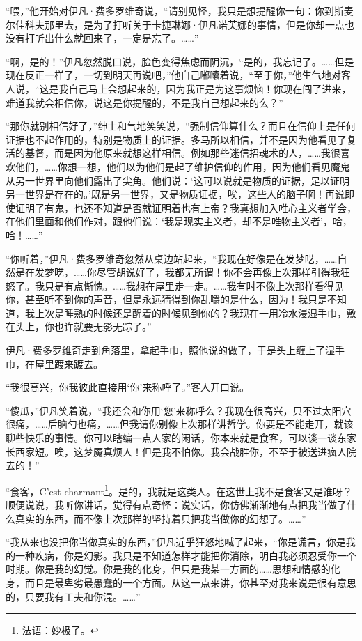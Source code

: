 \par “喂，”他开始对伊凡·费多罗维奇说，“请别见怪，我只是想提醒你一句：你到斯麦尔佳科夫那里去，是为了打听关于卡捷琳娜·伊凡诺芙娜的事情，但是你却一点也没有打听出什么就回来了，一定是忘了。……”
\par “啊，是的！”伊凡忽然脱口说，脸色变得焦虑而阴沉，“是的，我忘记了。……但是现在反正一样了，一切到明天再说吧，”他自己嘟囔着说，“至于你，”他生气地对客人说，“这是我自己马上会想起来的，因为我正是为这事烦恼！你现在闯了进来，难道我就会相信你，说这是你提醒的，不是我自己想起来的么？”
\par “那你就别相信好了，”绅士和气地笑笑说，“强制信仰算什么？而且在信仰上是任何证据也不起作用的，特别是物质上的证据。多马所以相信，并不是因为他看见了复活的基督，而是因为他原来就想这样相信。例如那些迷信招魂术的人，……我很喜欢他们，……你想一想，他们以为他们是起了维护信仰的作用，因为他们看见魔鬼从另一世界里向他们露出了尖角。他们说：‘这可以说就是物质的证据，足以证明另一世界是存在的。’既是另一世界，又是物质证据，唉，这些人的脑子啊！再说即使证明了有鬼，也还不知道是否就证明着也有上帝？我真想加入唯心主义者学会，在他们里面和他们作对，跟他们说：‘我是现实主义者，却不是唯物主义者’，哈，哈！……”
\par “你听着，”伊凡·费多罗维奇忽然从桌边站起来，“我现在好像是在发梦呓，……自然是在发梦呓，……你尽管胡说好了，我都无所谓！你不会再像上次那样引得我狂怒了。我只是有点惭愧。……我想在屋里走一走。……我有时不像上次那样看得见你，甚至听不到你的声音，但是永远猜得到你乱嚼的是什么，因为！我只是不知道，我上次是睡熟的时候还是醒着的时候见到你的？我现在一用冷水浸湿手巾，敷在头上，你也许就要无影无踪了。”
\par 伊凡·费多罗维奇走到角落里，拿起手巾，照他说的做了，于是头上缠上了湿手巾，在屋里踱来踱去。
\par “我很高兴，你我彼此直接用‘你’来称呼了。”客人开口说。
\par “傻瓜，”伊凡笑着说，“我还会和你用‘您’来称呼么？我现在很高兴，只不过太阳穴很痛，……后脑勺也痛，……但我请你别像上次那样讲哲学。你要是不能走开，就该聊些快乐的事情。你可以瞎编一点人家的闲话，你本来就是食客，可以谈一谈东家长西家短。唉，这梦魇真烦人！但是我不怕你。我会战胜你，不至于被送进疯人院去的！”
\par “食客，C’est charmant\footnote{法语：妙极了。}。是的，我就是这类人。在这世上我不是食客又是谁呀？顺便说说，我听你讲话，觉得有点奇怪：说实话，你仿佛渐渐地有点把我当做了什么真实的东西，而不像上次那样的坚持着只把我当做你的幻想了。……”
\par “我从来也没把你当做真实的东西，”伊凡近乎狂怒地喊了起来，“你是谎言，你是我的一种疾病，你是幻影。我只是不知道怎样才能把你消除，明白我必须忍受你一个时期。你是我的幻觉。你是我的化身，但只是我某一方面的……思想和情感的化身，而且是最卑劣最愚蠢的一个方面。从这一点来讲，你甚至对我来说是很有意思的，只要我有工夫和你混。……”
